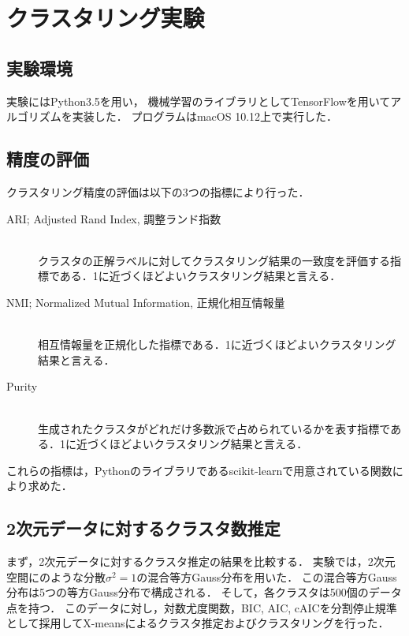 \section{クラスタリング実験}

\subsection{実験環境}

実験にはPython3.5を用い，
機械学習のライブラリとしてTensorFlowを用いてアルゴリズムを実装した．
プログラムはmacOS 10.12上で実行した．

\subsection{精度の評価}

クラスタリング精度の評価は以下の3つの指標により行った．
\begin{description}
  \item[ARI; Adjusted Rand Index, 調整ランド指数]~\\
    クラスタの正解ラベルに対してクラスタリング結果の一致度を評価する指標である．1に近づくほどよいクラスタリング結果と言える．
  \item[NMI; Normalized Mutual Information, 正規化相互情報量]~\\
    相互情報量を正規化した指標である．1に近づくほどよいクラスタリング結果と言える．
  \item[Purity]~\\
    生成されたクラスタがどれだけ多数派で占められているかを表す指標である．1に近づくほどよいクラスタリング結果と言える．
\end{description}
これらの指標は，Pythonのライブラリであるscikit-learnで用意されている関数により求めた．

\subsection{2次元データに対するクラスタ数推定}

まず，2次元データに対するクラスタ推定の結果を比較する．
実験では，2次元空間にのような分散$\sigma^2=1$の混合等方Gauss分布を用いた．
この混合等方Gauss分布は5つの等方Gauss分布で構成される．
そして，各クラスタは500個のデータ点を持つ．
このデータに対し，対数尤度関数，BIC, AIC, cAICを分割停止規準として採用してX-meansによるクラスタ推定およびクラスタリングを行った．

